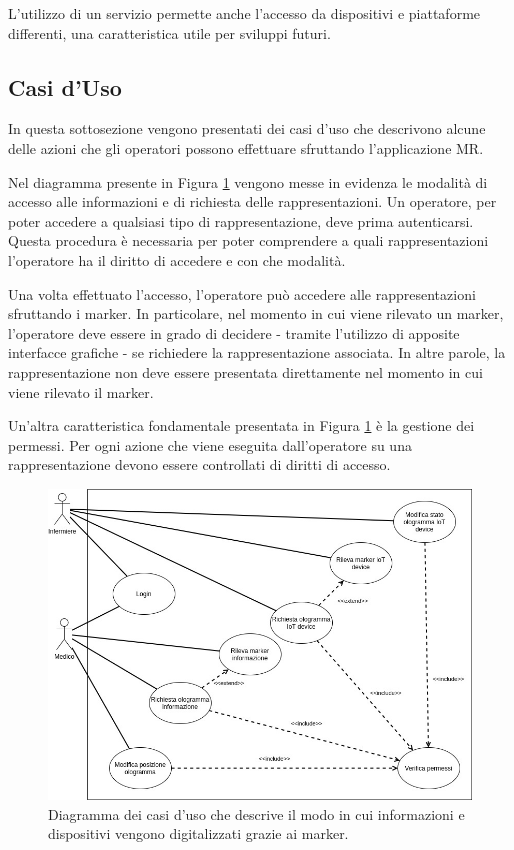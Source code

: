 L'utilizzo di un servizio permette anche l'accesso da dispositivi e piattaforme differenti, una caratteristica utile per sviluppi futuri.

\subsection{Casi d'Uso}
In questa sottosezione vengono presentati dei casi d'uso che descrivono alcune delle azioni che gli operatori possono effettuare sfruttando l'applicazione MR.

Nel diagramma presente in Figura \ref{fig:figure4} vengono messe in evidenza le modalità di accesso alle informazioni e di richiesta delle rappresentazioni.
Un operatore, per poter accedere a qualsiasi tipo di rappresentazione, deve prima autenticarsi. Questa procedura è necessaria per poter comprendere a quali rappresentazioni l'operatore ha il diritto di accedere e con che modalità.

Una volta effettuato l'accesso, l'operatore può accedere alle rappresentazioni sfruttando i marker. In particolare, nel momento in cui viene rilevato un marker, l'operatore deve essere in grado di decidere - tramite l'utilizzo di apposite interfacce grafiche - se richiedere la rappresentazione associata. In altre parole, la rappresentazione non deve essere presentata direttamente nel momento in cui viene rilevato il marker.

Un'altra caratteristica fondamentale presentata in Figura \ref{fig:figure4} è la gestione dei permessi. Per ogni azione che viene eseguita dall'operatore su una rappresentazione devono essere controllati di diritti di accesso.

\begin{figure}[H]
    \centering
    \includegraphics[width=\textwidth]{images/Casi uso-Page-1.jpg}
    \caption{Diagramma dei casi d'uso che descrive il modo in cui informazioni e dispositivi vengono digitalizzati grazie ai marker.}
    \label{fig:figure4}
\end{figure}

